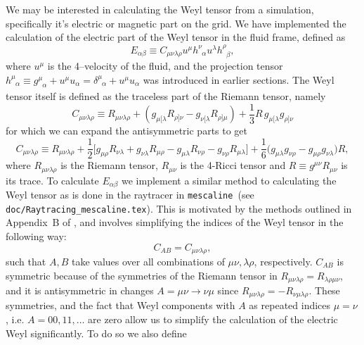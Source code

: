 \documentclass[a4paper]{article}
\newcommand{\ph}{\phantom}
\newcommand{\alp}{\alpha}
\newcommand{\mesc}{\texttt{mescaline}}
\begin{document}
We may be interested in calculating the Weyl tensor from a simulation, specifically it's electric or magnetic part on the grid. We have implemented the calculation of the electric part of the Weyl tensor in the fluid frame, defined as
\begin{equation}\label{eq:Eabdef}
	E_{\alp\beta} \equiv C_{\mu\nu\lambda\rho} u^\mu h^\nu_{\ph{\nu}\alp} u^\lambda h^\rho_{\ph{\rho}\beta},
\end{equation}
where $u^\mu$ is the 4--velocity of the fluid, and the projection tensor $h^\mu_{\ph{\mu}\alp}\equiv g^\mu_{\ph{\mu}\alp} + u^\mu u_\alp = \delta^\mu_{\ph{\mu}\alp} + u^\mu u_\alp$ was introduced in earlier sections. The Weyl tensor itself is defined as the traceless part of the Riemann tensor, namely
\begin{equation}\label{eq:weyldef}
	C_{\mu\nu\lambda\rho} \equiv R_{\mu\nu\lambda\rho} + \left( g_{\mu[\lambda}R_{\rho]\nu} - g_{\nu[\lambda}R_{\rho]\mu} \right) + \frac{1}{3}R\, g_{\mu[\lambda}g_{\rho]\nu}
\end{equation}
for which we can expand the antisymmetric parts to get
\begin{equation}%
	C_{\mu\nu\lambda\rho} \equiv R_{\mu\nu\lambda\rho} + \frac{1}{2} \Bigg[ g_{\mu\rho}R_{\nu\lambda} + g_{\nu\lambda}R_{\mu\rho} - g_{\mu\lambda}R_{\nu\rho} - g_{\nu\rho}R_{\mu\lambda}\Bigg] + \frac{1}{6} \Bigg( g_{\mu\lambda} g_{\nu\rho} - g_{\mu\rho} g_{\nu\lambda} \Bigg) R,
\end{equation}
where $R_{\mu\nu\lambda\rho}$ is the Riemann tensor, $R_{\mu\nu}$ is the 4-Ricci tensor and $R\equiv g^{\mu\nu}R_{\mu\nu}$ is its trace. To calculate $E_{\alp\beta}$ we implement a similar method to calculating the Weyl tensor as is done in the raytracer in \mesc\ (see \texttt{doc/Raytracing\_mescaline.tex}). This is motivated by the methods outlined in Appendix~B of \citet{giblin2016b}, and involves simplifying the indices of the Weyl tensor in the following way:
\begin{equation}
	C_{AB} = C_{\mu\nu\lambda\rho},
\end{equation}
such that $A,B$ take values over all combinations of $\mu\nu,\lambda\rho$, respectively. $C_{AB}$ is symmetric because of the symmetries of the Riemann tensor in $R_{\mu\nu\lambda\rho}=R_{\lambda\rho\mu\nu}$, and it is antisymmetric in changes $A=\mu\nu\rightarrow\nu\mu$ since $R_{\mu\nu\lambda\rho}=-R_{\nu\mu\lambda\rho}$. These symmetries, and the fact that Weyl components with $A$ as repeated indices $\mu=\nu$, i.e. $A=00,11,\ldots$ are zero allow us to simplify the calculation of the electric Weyl significantly. To do so we also define
\end{document}
